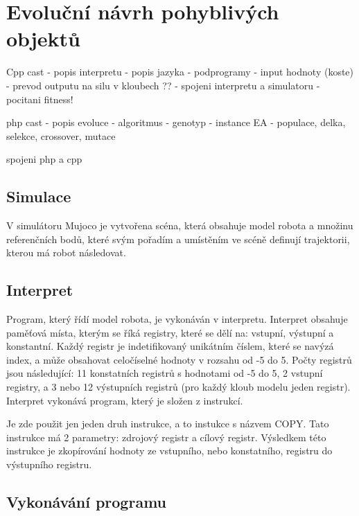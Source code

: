 \chapter{Evoluční návrh pohyblivých objektů}


Cpp cast
- popis interpretu
- popis jazyka
- podprogramy
- input hodnoty (koste)
- prevod outputu na silu v kloubech ??
- spojeni interpretu a simulatoru
- pocitani fitness!

php cast
- popis evoluce
- algoritmus
- genotyp
- instance EA - populace, delka, selekce, crossover, mutace

spojeni php a cpp

\section{Simulace}

V simulátoru Mujoco je vytvořena scéna, která obsahuje model robota a množinu referenčních bodů, které svým pořadím a umístěním ve scéně definují trajektorii, kterou má robot následovat.


\section{Interpret}

Program, který řídí model robota, je vykonáván v interpretu.
Interpret obsahuje paměťová místa, kterým se říká registry, které se dělí na: vstupní, výstupní a konstantní.
Každý registr je indetifikovaný unikátním číslem, které se navýzá index, a může obsahovat celočíselné hodnoty v rozsahu od -5 do 5.
Počty registrů jsou následující: 11 konstatních registrů s hodnotami od -5 do 5, 2 vstupní registry, a 3 nebo 12 výstupních registrů (pro každý kloub modelu jeden registr).
Interpret vykonává program, který je složen z instrukcí.

Je zde použit jen jeden druh instrukce, a to instukce s názvem COPY.
Tato instrukce má 2 parametry: zdrojový registr a cílový registr.
Výsledkem této instrukce je zkopírování hodnoty ze vstupního, nebo konstatního, registru do výstupního registru.

\section{Vykonávání programu}

